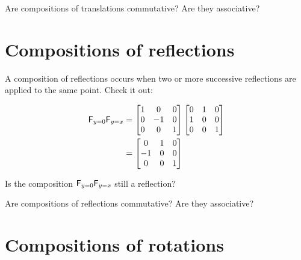 \documentclass{ximera}
\begin{document}
\begin{question}
Are compositions of translations commutative?  Are they
associative?
\end{question}



\section{Compositions of reflections}

A composition of reflections occurs when two or more successive
reflections are applied to the same point. Check it out:

\begin{align*}
\mathsf{F}_{y=0}\mathsf{F}_{y=x} &= \begin{bmatrix}
1 &  0 & 0\\
0 & -1 & 0\\
0 &  0 & 1
\end{bmatrix}
\begin{bmatrix}
0 & 1 & 0\\
1 & 0 & 0\\
0 & 0 & 1
\end{bmatrix}\\
&= \begin{bmatrix}
 0 & 1 & 0\\
-1 & 0 & 0\\
 0 & 0 & 1
\end{bmatrix}
\end{align*}


\begin{question}
Is the composition $\mathsf{F}_{y=0}\mathsf{F}_{y=x}$ still a reflection?
\end{question}


\begin{question}
Are compositions of reflections commutative?  Are they
associative?
\end{question}




\section{Compositions of rotations}
\end{document}
